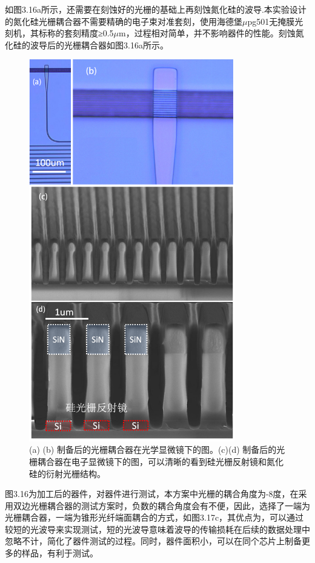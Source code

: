 如图3.16a所示，还需要在刻蚀好的光栅的基础上再刻蚀氮化硅的波导.本实验设计的氮化硅光栅耦合器不需要精确的电子束对准套刻，使用海德堡$\mu$pg501无掩膜光刻机，其标称的套刻精度≥0.5$\mu$m，过程相对简单，并不影响器件的性能。刻蚀氮化硅的波导后的光栅耦合器如图3.16a所示。

\begin{figure}[!htbp]
    \centering
    \includegraphics[width=0.8\textwidth]{Img/3-16.png}
    \caption{(a) (b) 制备后的光栅耦合器在光学显微镜下的图。(c)(d) 制备后的光栅耦合器在电子显微镜下的图，可以清晰的看到硅光栅反射镜和氮化硅的衍射光栅结构。}
    \label{fig:3-16}
\end{figure}

图3.16为加工后的器件，对器件进行测试，本方案中光栅的耦合角度为-8度，在采用双边光栅耦合器的测试方案时，负数的耦合角度会有不便，因此，选择了一端为光栅耦合器，一端为锥形光纤端面耦合的方式，如图3.17c，其优点为，可以通过较短的光波导来实现测试，短的光波导意味着波导的传输损耗在后续的数据处理中忽略不计，简化了器件测试的过程。同时，器件面积小，可以在同个芯片上制备更多的样品，有利于测试。

